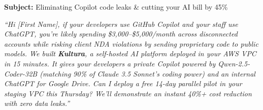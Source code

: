 \documentclass[10pt,a4paper]{article}
\begin{document}
\begin{pitchbox}
\textbf{Subject:} Eliminating Copilot code leaks \& cutting your AI bill by 45\%

\vspace{3pt}
\textit{``Hi [First Name], if your developers use GitHub Copilot and your staff use ChatGPT, you're likely spending \$3,000--\$5,000/month across disconnected accounts while risking client NDA violations by sending proprietary code to public models. We built \textbf{Kultura}, a self-hosted AI platform deployed in your AWS VPC in 15 minutes. It gives your developers a private Copilot powered by Qwen-2.5-Coder-32B (matching 90\% of Claude 3.5 Sonnet's coding power) and an internal ChatGPT for Google Drive. Can I deploy a free 14-day parallel pilot in your staging VPC this Thursday? We'll demonstrate an instant 40\%+ cost reduction with zero data leaks.''}
\end{pitchbox}
\end{document}
